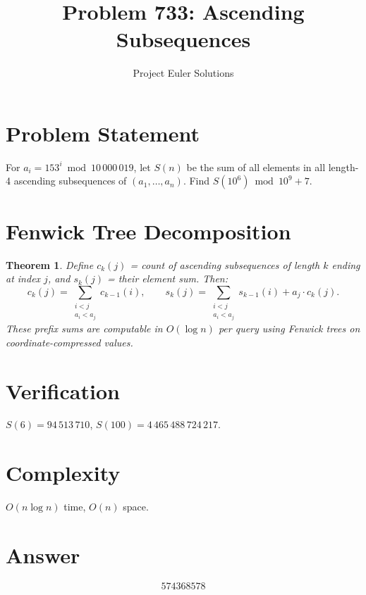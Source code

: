 \documentclass[11pt]{article}
\title{Problem 733: Ascending Subsequences}
\author{Project Euler Solutions}
\date{}
\newtheorem{theorem}{Theorem}
\begin{document}
\maketitle

\section{Problem Statement}
For $a_i = 153^i \bmod 10\,000\,019$, let $S(n)$ be the sum of all elements in all length-4 ascending subsequences of $(a_1, \ldots, a_n)$. Find $S(10^6) \bmod 10^9+7$.

\section{Fenwick Tree Decomposition}

\begin{theorem}
Define $c_k(j)$ = count of ascending subsequences of length $k$ ending at index $j$, and $s_k(j)$ = their element sum. Then:
\[
c_k(j) = \sum_{\substack{i<j\\a_i<a_j}} c_{k-1}(i), \qquad s_k(j) = \sum_{\substack{i<j\\a_i<a_j}} s_{k-1}(i) + a_j \cdot c_k(j).
\]
These prefix sums are computable in $O(\log n)$ per query using Fenwick trees on coordinate-compressed values.
\end{theorem}

\section{Verification}
$S(6) = 94\,513\,710$, $S(100) = 4\,465\,488\,724\,217$.

\section{Complexity}
$O(n \log n)$ time, $O(n)$ space.

\section{Answer}

\[
\boxed{574368578}
\]
\end{document}
